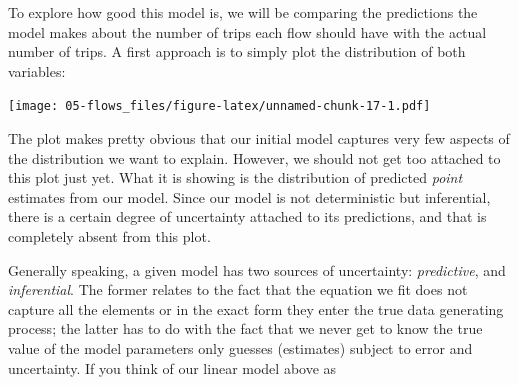 \documentclass[
]{book}
\newenvironment{Shaded}{\begin{snugshade}}{\end{snugshade}}
\newcommand{\DataTypeTok}[1]{\textcolor[rgb]{0.13,0.29,0.53}{#1}}
\newcommand{\DecValTok}[1]{\textcolor[rgb]{0.00,0.00,0.81}{#1}}
\newcommand{\KeywordTok}[1]{\textcolor[rgb]{0.13,0.29,0.53}{\textbf{#1}}}
\newcommand{\NormalTok}[1]{#1}
\newcommand{\OperatorTok}[1]{\textcolor[rgb]{0.81,0.36,0.00}{\textbf{#1}}}
\newcommand{\StringTok}[1]{\textcolor[rgb]{0.31,0.60,0.02}{#1}}
\begin{document}
To explore how good this model is, we will be comparing the predictions the model makes about the number of trips each flow should have with the actual number of trips. A first approach is to simply plot the distribution of both variables:

\begin{Shaded}
\end{Shaded}

\texttt{[image: 05-flows\_files/figure-latex/unnamed-chunk-17-1.pdf]}

The plot makes pretty obvious that our initial model captures very few aspects of the distribution we want to explain. However, we should not get too attached to this plot just yet. What it is showing is the distribution of predicted \emph{point} estimates from our model. Since our model is not deterministic but inferential, there is a certain degree of uncertainty attached to its predictions, and that is completely absent from this plot.

Generally speaking, a given model has two sources of uncertainty: \emph{predictive}, and \emph{inferential}. The former relates to the fact that the equation we fit does not capture all the elements or in the exact form they enter the true data generating process; the latter has to do with the fact that we never get to know the true value of the model parameters only guesses (estimates) subject to error and uncertainty. If you think of our linear model above as
\end{document}
